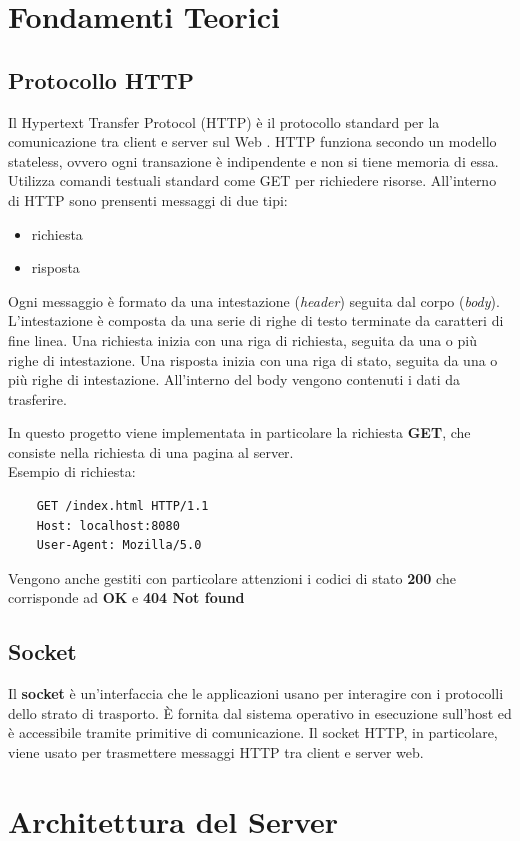 \documentclass[a4paper,12pt]{report}
\begin{document}
\chapter{Fondamenti Teorici}
\section{Protocollo HTTP}
Il Hypertext Transfer Protocol (HTTP) è il protocollo standard per la comunicazione tra client e server sul Web . HTTP funziona secondo
un modello stateless, ovvero ogni transazione è indipendente e non si tiene memoria di essa. Utilizza comandi testuali standard come 
GET per richiedere risorse. All'interno di HTTP sono prensenti messaggi di due tipi:
\begin{itemize}
    \item richiesta
    \item risposta
\end{itemize}
Ogni messaggio è formato da una intestazione (\emph{header}) seguita dal corpo (\emph{body}). L'intestazione è composta da una serie di righe di testo
terminate da caratteri di fine linea. Una richiesta inizia con una riga di richiesta, seguita da una o più righe di intestazione. Una 
risposta inizia con una riga di stato, seguita da una o più righe di intestazione. All'interno del body vengono contenuti i dati da 
trasferire. 

In questo progetto viene implementata in particolare la richiesta \textbf{GET}, che consiste nella richiesta di una pagina al server. \\Esempio di 
richiesta:
\begin{verbatim}
    GET /index.html HTTP/1.1
    Host: localhost:8080
    User-Agent: Mozilla/5.0
\end{verbatim}
    
Vengono anche gestiti con particolare attenzioni i codici di stato \textbf{200} che corrisponde ad \textbf{OK} e \textbf{404 Not found}
\section{Socket}
Il \textbf{socket} è un'interfaccia che le applicazioni usano per interagire con i protocolli dello strato di trasporto. 
È fornita dal sistema operativo in esecuzione sull'host ed è accessibile tramite primitive di comunicazione. 
Il socket HTTP, in particolare, viene usato per trasmettere messaggi HTTP tra client e server web.

\chapter{Architettura del Server}
\end{document}
